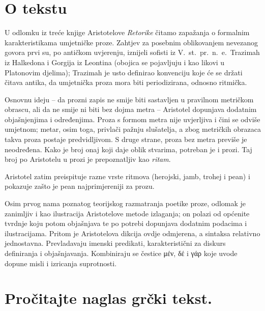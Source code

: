 


\section*{O tekstu}

U odlomku iz treće knjige Aristotelove \textit{Retorike} čitamo zapažanja o formalnim karakteristikama umjetničke proze. Zahtjev za posebnim oblikovanjem nevezanog govora prvi su, po antičkom uvjerenju, iznijeli sofisti iz V.~st.\ pr.~n.~e.\ Trazimah iz Halkedona i Gorgija iz Leontina (obojica se pojavljuju i kao likovi u Platonovim djelima); Trazimah je usto definirao konvenciju koje će se držati čitava antika, da umjetnička proza mora biti periodizirana, odnosno ritmička.

Osnovnu ideju – da prozni zapis ne smije biti sastavljen u pravilnom metričkom obrascu, ali da ne smije ni biti bez dojma metra – Aristotel dopunjava dodatnim objašnjenjima i određenjima. Proza s formom metra nije uvjerljiva i čini se odviše umjetnom; metar, osim toga, privlači pažnju slušatelja, a zbog metričkih obrazaca takva proza postaje predvidljivom. S druge strane, proza bez metra previše je neodređena. Kako je broj onaj koji daje oblik stvarima, potreban je i prozi. Taj broj po Aristotelu u prozi je prepoznatljiv kao \textit{ritam}. 

Aristotel zatim preispituje razne vrste ritmova (herojski, jamb, trohej i pean) i pokazuje zašto je pean najprimjereniji za prozu.

Osim prvog nama poznatog teorijskog razmatranja poetike proze, odlomak je zanimljiv i kao ilustracija Aristotelove metode izlaganja; on polazi od općenite tvrdnje koju potom objašnjava te po potrebi dopunjava dodatnim podacima i ilustracijama. Pritom je Aristotelova dikcija ovdje odmjerena, a sintaksa relativno jednostavna. Prevladavaju imenski predikati, karakteristični za diskurs definiranja i objašnjavanja. Kombiniraju se čestice μέν, δέ i γάρ koje uvode dopune misli i izricanja suprotnosti.


\newpage

\section*{Pročitajte naglas grčki tekst.}

